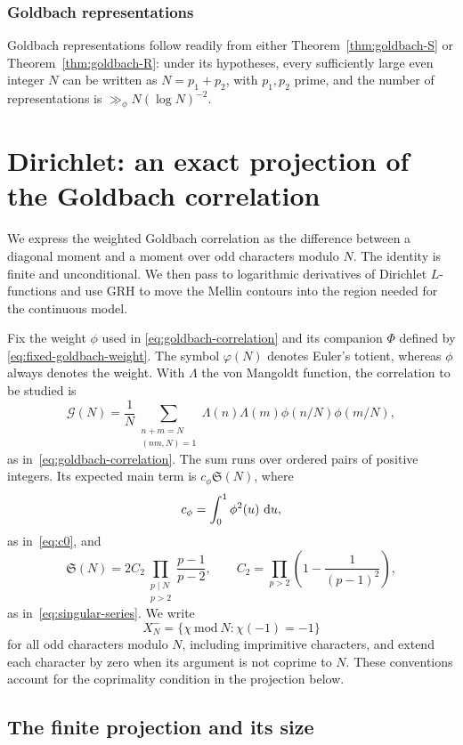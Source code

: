 \documentclass[12pt,a4paper]{amsart}
\numberwithin{equation}{section}
\def\d{\,{\rm d}}
\theoremstyle{plain}
\theoremstyle{definition}
\theoremstyle{remark}
\begin{document}
\subsubsection{Goldbach representations}
\label{story:primes-and-zeros}

Goldbach representations follow readily from either
Theorem~\ref{thm:goldbach-S} or Theorem~\ref{thm:goldbach-R}:
under its hypotheses, every sufficiently large even integer $N$
can be written as $N=p_1+p_2$, with $p_1,p_2$ prime,
and the number of representations is $\gg_\phi N(\log N)^{-2}$.

\section{Dirichlet: an exact projection of the Goldbach correlation}
\label{proof:sec:goldbach-projection}\label{proof:v7:dirichlet}
\label{proof:sec:arithmetic-motivation}\label{proof:v7:main-thread}

We express the weighted Goldbach correlation as the difference
between a diagonal moment and a moment over odd characters modulo $N$.
The identity is finite and unconditional. We then pass to logarithmic
derivatives of Dirichlet $L$-functions and use GRH to move the Mellin
contours into the region needed for the continuous model.

Fix the weight $\phi$ used in \eqref{eq:goldbach-correlation}
and its companion $\Phi$ defined by \eqref{eq:fixed-goldbach-weight}.
The symbol $\varphi(N)$ denotes Euler's
totient, whereas $\phi$ always denotes the weight. With $\Lambda$
the von Mangoldt function, the correlation to be studied is
\[
 \mathcal G(N)=\frac1N
 \sum_{\substack{n+m=N\\(nm,N)=1}}
       \Lambda(n)\Lambda(m)\phi(n/N)\phi(m/N),
\]
as in~\eqref{eq:goldbach-correlation}.
The sum runs over ordered pairs of positive integers. Its expected
main term is $c_\phi\mathfrak S(N)$, where
\[
 c_\phi=\int_0^1\phi^2(u)\,\d u,
\]
as in~\eqref{eq:c0},
and
\[
 \mathfrak S(N)=2C_2\prod_{\substack{p\mid N\\p>2}}\frac{p-1}{p-2},
 \qquad C_2=\prod_{p>2}\left(1-\frac1{(p-1)^2}\right),
\]
as in~\eqref{eq:singular-series}.
We write
\[
 X_N^-=\{\chi\ \mathrm{mod}\ N:\chi(-1)=-1\}
\]
for all odd characters modulo $N$, including imprimitive characters,
and extend each character by zero when its argument is not coprime
to $N$. These conventions account for the coprimality condition in
the projection below.

\subsection{The finite projection and its size}
\label{proof:v7:weight-class}\label{proof:v7:finite-character-moment}
\end{document}
